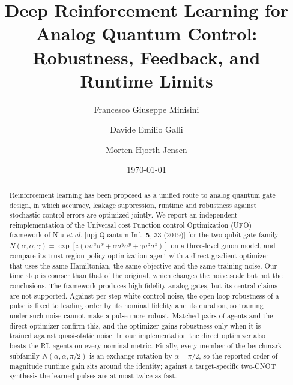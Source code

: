 \documentclass[aps,prx,twocolumn,superscriptaddress,nofootinbib,amsmath,amssymb,floatfix]{revtex4-2}
\begin{document}
\title{Deep Reinforcement Learning for Analog Quantum Control: Robustness, Feedback, and Runtime Limits}

\author{Francesco Giuseppe Minisini}
\author{Davide Emilio Galli}
\author{Morten Hjorth-Jensen}

\date{\today}

\begin{abstract}
Reinforcement learning has been proposed as a unified route to analog quantum gate design, in which
accuracy, leakage suppression, runtime and robustness against stochastic control errors are optimized
jointly. We report an independent reimplementation of the Universal cost Function control Optimization
(UFO) framework of Niu \emph{et al.} [npj Quantum Inf.\ \textbf{5}, 33 (2019)] for the two-qubit gate family
$N(\alpha,\alpha,\gamma)=\exp[i(\alpha\sigma^x\sigma^x+\alpha\sigma^y\sigma^y+\gamma\sigma^z\sigma^z)]$ on a
three-level gmon model, and compare its trust-region policy optimization agent with a direct gradient
optimizer that uses the same Hamiltonian, the same objective and the same training noise. Our time step is
coarser than that of the original, which changes the noise scale but not the conclusions. The framework
produces high-fidelity analog gates, but its central claims are not supported. Against per-step
white control noise, the open-loop robustness of a pulse is fixed to leading order by its nominal fidelity
and its duration, so training under such noise cannot make a pulse more robust. Matched pairs of agents
and the direct optimizer confirm this, and the optimizer gains robustness only when it is trained against
quasi-static noise. In our implementation the direct optimizer also beats the RL agents on every
nominal metric. Finally, every member of the benchmark subfamily $N(\alpha,\alpha,\pi/2)$ is an exchange
rotation by $\alpha-\pi/2$, so the reported order-of-magnitude runtime gain sits around the identity;
against a target-specific two-CNOT synthesis the learned pulses are at most twice as fast. 
\end{abstract}

\maketitle
\end{document}
